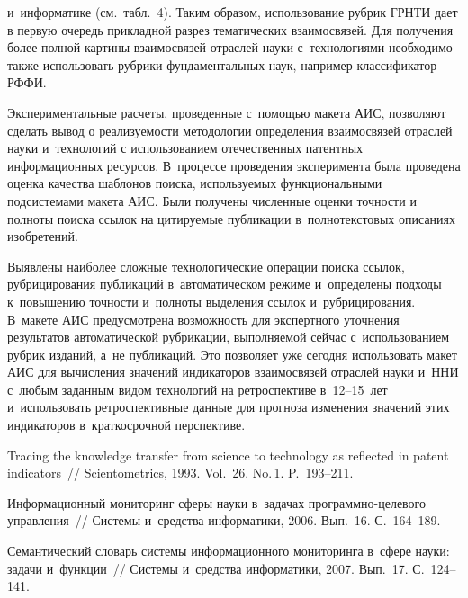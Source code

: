 \begin{multicols}{2}




\noindent
и~информатике (см.\ табл.~4). Таким образом, исполь\-зо\-ва\-ние рубрик ГРНТИ дает
в первую очередь прикладной разрез тематических взаимосвязей. Для получения более
полной картины взаимосвязей отраслей науки с~технологиями необходимо также
использовать рубрики фундаментальных наук, например классификатор РФФИ.

  Экспериментальные расчеты, проведенные с~помощью макета АИС, позволяют сделать
вывод о реализуемости методологии определения взаимосвязей отраслей науки и~технологий
с использованием отечественных патентных информационных ресурсов. В~процессе
проведения эксперимента была проведена оценка качества шаблонов поиска, используемых
функциональными подсистемами макета АИС. Были получены численные оценки точности
и полноты поиска ссылок на цитируемые публикации в~полнотекстовых описаниях
изобретений.

  Выявлены наиболее сложные технологические операции поиска ссылок, рубрицирования
публикаций в~автоматическом режиме и~определены подходы к~повышению точности и~полноты выделения ссылок и~рубрицирования.
В~макете АИС преду\-смот\-ре\-на возможность
для экспертного уточнения результатов автоматической рубрикации, выполняемой сейчас с~использованием рубрик изданий, а~не публикаций. Это позволяет уже сегодня использовать
макет АИС для вычисления значений индикаторов взаимосвязей отраслей науки
и~ННИ с~любым заданным видом технологий на ретроспективе
в~12--15~лет и~использовать ретроспективные данные для прогноза изменения значений
этих индикаторов в~краткосрочной перспективе.




{\small\frenchspacing
 {%
 \begin{thebibliography}{99}
 Tracing the knowledge transfer from science to technology as reflected in
patent indicators~// Scientometrics, 1993. Vol.~26. No.\,1. P.~193--211.

 Информационный мониторинг сферы науки в~задачах
про\-граммно-це\-ле\-во\-го управления~// Системы и~средства информатики, 2006. Вып.~16. С.~164--189.

 Семантический словарь системы информационного
мониторинга в~сфере науки: задачи и~функции~// Системы и~средства информатики, 2007. Вып.~17. С.~124--141.


\end{thebibliography}}}
\end{multicols}
